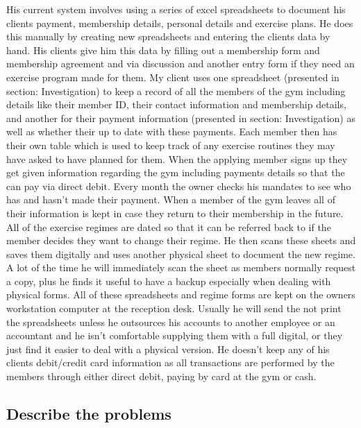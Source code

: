 His current system involves using a series of excel spreadsheets to document his clients payment, membership details, personal details and exercise plans. He does this manually by creating new spreadsheets and entering the clients data by hand. His clients give him this data by filling out a membership form and membership agreement and via discussion and another entry form if they need an exercise program made for them. My client uses one spreadsheet (presented in section: Investigation) to keep a record of all the members of the gym including details like their member ID, their contact information and membership details, and another for their payment information (presented in section: Investigation) as well as whether their up to date with these payments. Each member then has their own table which is used to keep track of any exercise routines they may have asked to have planned for them. When the applying member signs up they get given information regarding the gym including payments details so that the can pay via direct debit. Every month the owner checks his mandates to see who has and hasn't made their payment. When a member of the gym leaves all of their information is kept in case they return to their membership in the future. All of the exercise regimes are dated so that it can be referred back to if the member decides they want to change their regime. He then scans these sheets and saves them digitally and uses another physical sheet to document the new regime. A lot of the time he will immediately scan the sheet as members normally request a copy, plus he finds it useful to have a backup especially when dealing with physical forms. All of these spreadsheets and regime forms are kept on the owners workstation computer at the reception desk. Usually he will send the not print the spreadsheets unless he outsources his accounts to another employee or an accountant and he isn't comfortable supplying them with a full digital, or they just find it easier to deal with a physical version. He doesn't keep any of his clients debit/credit card information as all transactions are performed by the members through either direct debit, paying by card at the gym or cash.   

\subsection{Describe the problems}

